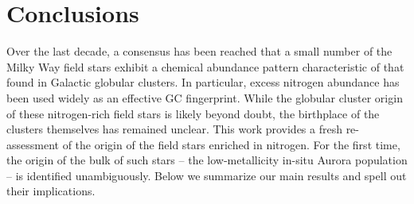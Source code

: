 \documentclass[a4paper,useAMS,usenatbib]{mnras}
\begin{document}
\section{Conclusions}
\label{sec:conc}

Over the last decade, a consensus has been reached that a small number of the Milky Way field stars exhibit a chemical abundance pattern characteristic of that found in Galactic globular clusters. In particular, excess nitrogen abundance has been used widely as an effective GC fingerprint. While the globular cluster origin of these nitrogen-rich field stars is likely beyond doubt, the birthplace of the clusters themselves has remained unclear. This work provides a fresh re-assessment of the origin of the field stars enriched in nitrogen. For the first time, the origin of the bulk of such stars -- the low-metallicity in-situ Aurora population -- is identified unambiguously. Below we summarize our main results and spell out their implications. 
\end{document}

